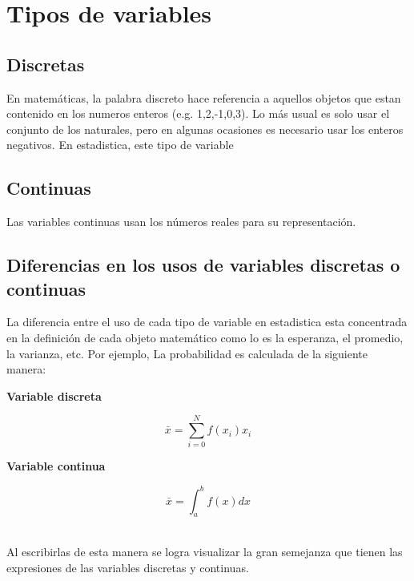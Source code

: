 \section{Tipos de variables}
\subsection{Discretas}
En matemáticas, la palabra discreto hace referencia a aquellos objetos que estan contenido en los numeros enteros (e.g. 1,2,-1,0,3). Lo más usual es solo usar el conjunto de los naturales, pero en algunas ocasiones es necesario usar los enteros negativos. En estadistica, este tipo de variable
\subsection{Continuas}
Las variables continuas usan los números reales para su representación.
\subsection{Diferencias en los usos de variables discretas o continuas}
La diferencia entre el uso de cada tipo de variable en estadistica esta concentrada en la definición de cada objeto matemático como lo es la esperanza, el promedio, la varianza, etc. Por ejemplo, La probabilidad es calculada de la siguiente manera:\\

\begin{minipage}{0.5\linewidth}
    \begin{center}
        \textbf{Variable discreta}
    \end{center}
    \begin{equation*}
        \bar{x}=\sum_{i=0}^N f(x_i)x_i
    \end{equation*}
\end{minipage}
\begin{minipage}{0.5\linewidth}
    \begin{center}
        \textbf{Variable continua}
    \end{center}
    \begin{equation*}
        \bar{x}=\int_a^b f(x)dx
    \end{equation*}
\end{minipage}\\

Al escribirlas de esta manera se logra visualizar la gran semejanza que tienen las expresiones de las variables discretas y continuas.

